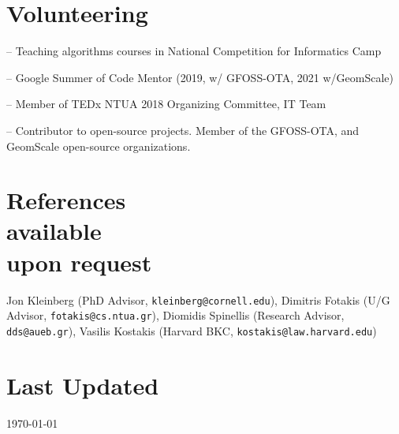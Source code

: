 \documentclass[margin, 10pt]{res}
\newcommand{\field}[2]{\noindent \textbf{#1} \hfill #2 \\}
\begin{document}
\begin{resume}
\section{Volunteering} 
\begin{compactitem}
    \item[--] Teaching algorithms courses in National Competition for Informatics Camp 
    \item[--] Google Summer of Code Mentor (2019, w/ GFOSS-OTA, 2021 w/GeomScale)
    \item[--] Member of TEDx NTUA 2018 Organizing Committee, IT Team 
    \item[--] Contributor to open-source projects. Member of the GFOSS-OTA, and GeomScale open-source organizations.

\end{compactitem}

\section{References \\ available \\ upon request}

Jon Kleinberg (PhD Advisor, \texttt{kleinberg@cornell.edu}), 
Dimitris Fotakis  (U/G Advisor, \texttt{fotakis@cs.ntua.gr}),
Diomidis Spinellis  (Research Advisor, \texttt{dds@aueb.gr}), 
Vasilis Kostakis  (Harvard BKC, \texttt{kostakis@law.harvard.edu}) 


\section{Last Updated} \today

\begin{comment}

\section{Selected \\ Projects \& Published \\ Software} 

\field{SADE} {\emph{August 2018 --}}
This project aims to perform software clusterings using vector semantics and the call graphs. The project had successful results on recovering clusters of the Linux Kernel.\\
Repository: \url{https://github.com/papachristoumarios/sade}


\end{comment}
\end{resume}
\end{document}
